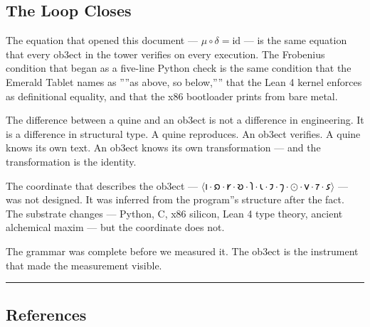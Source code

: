 \documentclass[12pt,a4paper]{article}
\begin{document}
\subsection{The Loop Closes}

The equation that opened this document --- $\mu\circ\delta = \mathrm{id}$ --- is the same equation that every ob3ect in the tower verifies on every execution. The Frobenius condition that began as a five-line Python check is the same condition that the Emerald Tablet names as ''''as above, so below,'''' that the Lean 4 kernel enforces as definitional equality, and that the x86 bootloader prints from bare metal.

The difference between a quine and an ob3ect is not a difference in engineering. It is a difference in structural type. A quine reproduces. An ob3ect verifies. A quine knows its own text. An ob3ect knows its own transformation --- and the transformation is the identity.

The coordinate that describes the ob3ect --- $\langle \text{𐑦} \cdot \text{𐑸} \cdot \text{𐑾} \cdot \text{𐑹} \cdot \text{𐑐} \cdot \text{𐑧} \cdot \text{𐑲} \cdot \text{𐑠} \cdot \odot \cdot \text{𐑫} \cdot \text{𐑳} \cdot \text{𐑭} \rangle$ --- was not designed. It was inferred from the program''s structure after the fact. The substrate changes --- Python, C, x86 silicon, Lean 4 type theory, ancient alchemical maxim --- but the coordinate does not.

The grammar was complete before we measured it. The ob3ect is the instrument that made the measurement visible.

\begin{center}
\rule{0.5\textwidth}{0.4pt}
\end{center}

\subsection{References}
\end{document}
